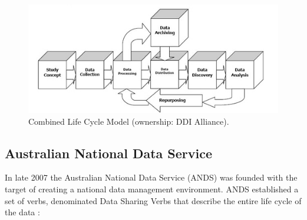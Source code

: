 \begin{figure}
    \center
    \includegraphics[width=\textwidth]{img/data_lifecycle/what-is-ddi-diagram.jpg}
    \caption{Combined Life Cycle Model (ownership: DDI Alliance).}
    \label{fig:ddi}
\end{figure}


\subsection{Australian National Data Service}

In late 2007 the Australian National Data Service (ANDS) was founded with the target of creating a national data management environment. ANDS established a set of verbs, denominated Data Sharing Verbs that describe the entire life cycle of the data \cite{burton_designing_2009}:

